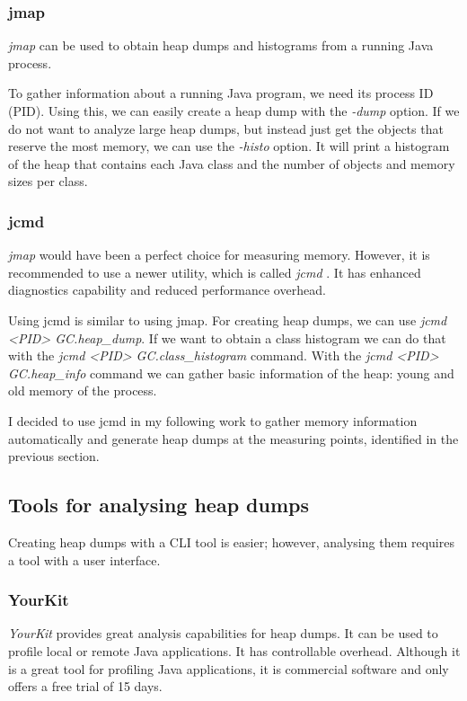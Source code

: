 \subsubsection{jmap}
\textit{jmap} \cite{jmap-jcmd} can be used to obtain heap dumps and histograms from a running Java process.

To gather information about a running Java program, we need its process ID (PID). Using this, we can easily create a heap dump with the \textit{-dump} option. If we do not want to analyze large heap dumps, but instead just get the objects that reserve the most memory, we can use the \textit{-histo} option. It will print a histogram of the heap that contains each Java class and the number of objects and memory sizes per class.

\subsubsection{jcmd}
\textit{jmap} would have been a perfect choice for measuring memory. However, it is recommended to use a newer utility, which is called \textit{jcmd} \cite{jmap-jcmd}. It has enhanced diagnostics capability and reduced performance overhead. 

Using jcmd is similar to using jmap. For creating heap dumps, we can use \textit{jcmd <PID> GC.heap\_dump}. If we want to obtain a class histogram we can do that with the \textit{jcmd <PID> GC.class\_histogram} command. With the \textit{jcmd <PID> GC.heap\_info} command we can gather basic information of the heap: \eg young and old memory of the process.

I decided to use jcmd in my following work to gather memory information automatically and generate heap dumps at the measuring points, identified in the previous section.

\subsection{Tools for analysing heap dumps}
Creating heap dumps with a CLI tool is easier; however, analysing them requires a tool with a user interface. 

\subsubsection{YourKit}
\textit{YourKit} provides great analysis capabilities for heap dumps. It can be used to profile local or remote Java applications. It has controllable overhead. Although it is a great tool for profiling Java applications, it is commercial software and only offers a free trial of 15 days.

